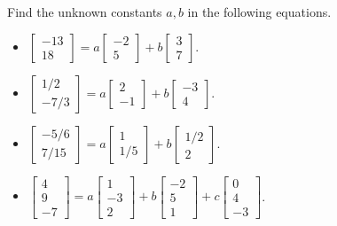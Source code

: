 \documentclass[../main.tex]{subfiles}
\begin{document}
\begin{exercise}
  Find the unknown constants \(a,b\) in the following equations.

  \begin{itemize}
    \item \(\begin{bmatrix} -13 \\ 18 \end{bmatrix} = a \begin{bmatrix} -2 \\ 5 \end{bmatrix} + b \begin{bmatrix} 3 \\ 7 \end{bmatrix}\).
    \item \(\begin{bmatrix} 1/2 \\ -7/3 \end{bmatrix} = a \begin{bmatrix} 2 \\ -1 \end{bmatrix} + b \begin{bmatrix} -3 \\ 4 \end{bmatrix}\).
    \item \(\begin{bmatrix} -5/6 \\ 7/15 \end{bmatrix} = a \begin{bmatrix} 1 \\ 1/5 \end{bmatrix} + b \begin{bmatrix} 1/2 \\ 2 \end{bmatrix}\).
    \item \(\begin{bmatrix} 4 \\ 9 \\ -7 \end{bmatrix} = a \begin{bmatrix} 1 \\ -3 \\ 2 \end{bmatrix} + b \begin{bmatrix} -2 \\ 5 \\ 1 \end{bmatrix} + c \begin{bmatrix} 0 \\ 4 \\ -3 \end{bmatrix}\).
  \end{itemize}


\end{exercise}
\end{document}
